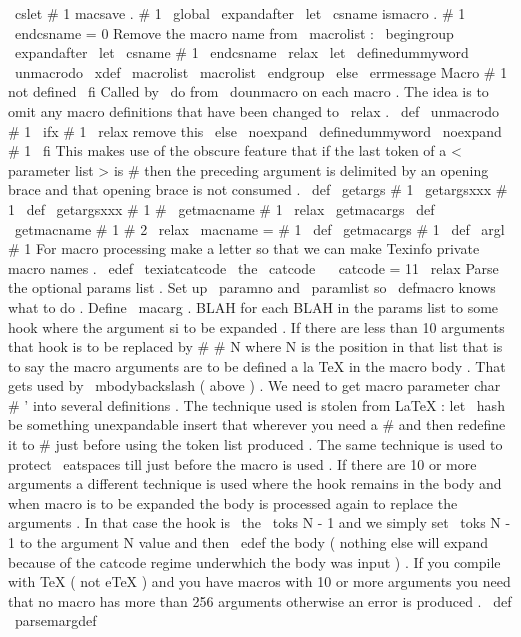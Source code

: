 {{{{{\
cslet
{
#
1
}
{
macsave
.
#
1
}
%
\
global
\
expandafter
\
let
\
csname
ismacro
.
#
1
\
endcsname
=
0
%
%
Remove
the
macro
name
from
\
macrolist
:
\
begingroup
\
expandafter
\
let
\
csname
#
1
\
endcsname
\
relax
\
let
\
definedummyword
\
unmacrodo
\
xdef
\
macrolist
{
\
macrolist
}
%
\
endgroup
\
else
\
errmessage
{
Macro
#
1
not
defined
}
%
\
fi
}
%
Called
by
\
do
from
\
dounmacro
on
each
macro
.
The
idea
is
to
omit
any
%
macro
definitions
that
have
been
changed
to
\
relax
.
%
\
def
\
unmacrodo
#
1
{
%
\
ifx
#
1
\
relax
%
remove
this
\
else
\
noexpand
\
definedummyword
\
noexpand
#
1
%
\
fi
}
%
This
makes
use
of
the
obscure
feature
that
if
the
last
token
of
a
%
<
parameter
list
>
is
#
then
the
preceding
argument
is
delimited
by
%
an
opening
brace
and
that
opening
brace
is
not
consumed
.
\
def
\
getargs
#
1
{
\
getargsxxx
#
1
{
}
}
\
def
\
getargsxxx
#
1
#
{
\
getmacname
#
1
\
relax
\
getmacargs
}
\
def
\
getmacname
#
1
#
2
\
relax
{
\
macname
=
{
#
1
}
}
\
def
\
getmacargs
#
1
{
\
def
\
argl
{
#
1
}
}
%
For
macro
processing
make
a
letter
so
that
we
can
make
Texinfo
private
macro
names
.
\
edef
\
texiatcatcode
{
\
the
\
catcode
\
}
\
catcode
=
11
\
relax
%
Parse
the
optional
{
params
}
list
.
Set
up
\
paramno
and
\
paramlist
%
so
\
defmacro
knows
what
to
do
.
Define
\
macarg
.
BLAH
for
each
BLAH
%
in
the
params
list
to
some
hook
where
the
argument
si
to
be
expanded
.
If
%
there
are
less
than
10
arguments
that
hook
is
to
be
replaced
by
#
#
N
where
N
%
is
the
position
in
that
list
that
is
to
say
the
macro
arguments
are
to
be
%
defined
a
la
TeX
in
the
macro
body
.
%
%
That
gets
used
by
\
mbodybackslash
(
above
)
.
%
%
We
need
to
get
macro
parameter
char
#
'
into
several
definitions
.
%
The
technique
used
is
stolen
from
LaTeX
:
let
\
hash
be
something
%
unexpandable
insert
that
wherever
you
need
a
#
and
then
redefine
%
it
to
#
just
before
using
the
token
list
produced
.
%
%
The
same
technique
is
used
to
protect
\
eatspaces
till
just
before
%
the
macro
is
used
.
%
%
If
there
are
10
or
more
arguments
a
different
technique
is
used
where
the
%
hook
remains
in
the
body
and
when
macro
is
to
be
expanded
the
body
is
%
processed
again
to
replace
the
arguments
.
%
%
In
that
case
the
hook
is
\
the
\
toks
N
-
1
and
we
simply
set
\
toks
N
-
1
to
the
%
argument
N
value
and
then
\
edef
the
body
(
nothing
else
will
expand
because
of
%
the
catcode
regime
underwhich
the
body
was
input
)
.
%
%
If
you
compile
with
TeX
(
not
eTeX
)
and
you
have
macros
with
10
or
more
%
arguments
you
need
that
no
macro
has
more
than
256
arguments
otherwise
an
%
error
is
produced
.
\
def
\
parsemargdef
}}}}
